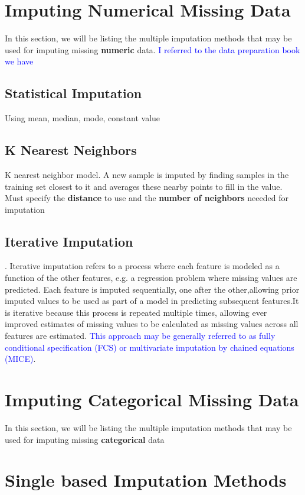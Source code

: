 \documentclass{article}
\begin{document}
\section{Imputing Numerical Missing Data}
In this section, we will be listing the multiple imputation methods that may be used for imputing missing \textbf{numeric} data. \textcolor{blue}{I referred to the data preparation book we have}

\subsection{Statistical Imputation}
Using mean, median, mode, constant value

\subsection{K Nearest Neighbors}
K nearest neighbor model. A new sample is imputed by finding samples in the training set closest to it and averages these nearby points to fill in the value. Must specify the \textbf{distance} to use and the \textbf{number of neighbors} neeeded for imputation

\subsection{Iterative Imputation}
.  Iterative imputation refers to a process where each feature is modeled as a function of the other features, e.g.  a regression problem where missing values are predicted.  Each feature is imputed sequentially, one after the other,allowing prior imputed values to be used as part of a model in predicting subsequent features.It is iterative because this process is repeated multiple times, allowing ever improved estimates of missing values to be calculated as missing values across all features are estimated.  \textcolor{blue}{This approach may be generally referred to as fully conditional specification (FCS) or multivariate imputation by chained equations (MICE)}.

\section{Imputing Categorical Missing Data}
In this section, we will be listing the multiple imputation methods that may be used for imputing missing \textbf{categorical} data

\section*{Single based Imputation Methods}
\end{document}
